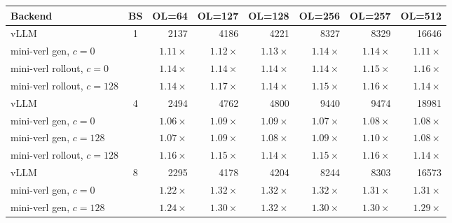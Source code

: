 \begin{table}[htbp]
    \centering
    \small
    \begin{adjustbox}{max width=\textwidth}
    \begin{tabular}{lcrrrrrr}
        \toprule
        \textbf{Backend} & \textbf{BS} &
        \textbf{OL=64} & \textbf{OL=127} & \textbf{OL=128} &
        \textbf{OL=256} & \textbf{OL=257} & \textbf{OL=512} \\
        \midrule
        vLLM                         & 1 & 2137 & 4186 & 4221 & 8327 & 8329 & 16646 \\
        mini-verl gen, $c{=}0$       &   & $1.11{\times}$ & $1.12{\times}$ & $1.13{\times}$ & $1.14{\times}$ & $1.14{\times}$ & $1.11{\times}$ \\
        mini-verl rollout, $c{=}0$   &   & $1.14{\times}$ & $1.14{\times}$ & $1.14{\times}$ & $1.14{\times}$ & $1.15{\times}$ & $1.16{\times}$ \\
        mini-verl rollout, $c{=}128$ &   & $1.14{\times}$ & $1.17{\times}$ & $1.14{\times}$ & $1.15{\times}$ & $1.16{\times}$ & $1.14{\times}$ \\
        \midrule
        vLLM                         & 4 & 2494 & 4762 & 4800 & 9440 & 9474 & 18981 \\
        mini-verl gen, $c{=}0$       &   & $1.06{\times}$ & $1.09{\times}$ & $1.09{\times}$ & $1.07{\times}$ & $1.08{\times}$ & $1.08{\times}$ \\
        mini-verl gen, $c{=}128$     &   & $1.07{\times}$ & $1.09{\times}$ & $1.08{\times}$ & $1.09{\times}$ & $1.10{\times}$ & $1.08{\times}$ \\
        mini-verl rollout, $c{=}128$ &   & $1.16{\times}$ & $1.15{\times}$ & $1.14{\times}$ & $1.15{\times}$ & $1.16{\times}$ & $1.14{\times}$ \\
        \midrule
        vLLM                         & 8 & 2295 & 4178 & 4204 & 8244 & 8303 & 16573 \\
        mini-verl gen, $c{=}0$       &   & $1.22{\times}$ & $1.32{\times}$ & $1.32{\times}$ & $1.32{\times}$ & $1.31{\times}$ & $1.31{\times}$ \\
        mini-verl gen, $c{=}128$     &   & $1.24{\times}$ & $1.30{\times}$ & $1.32{\times}$ & $1.30{\times}$ & $1.30{\times}$ & $1.29{\times}$ \\

\end{tabular}
\end{adjustbox}
\end{table}
